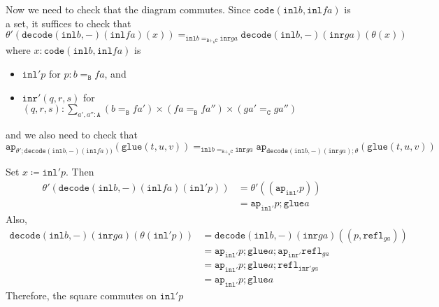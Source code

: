 \documentclass[12pt]{amsart}
\newcommand{\type}[1]{\mathtt{#1}}
\newcommand{\tin}{\colon}
\newcommand{\A}{\type{A}}
\newcommand{\B}{\type{B}}
\newcommand{\C}{\type{C}}
\newcommand{\BAC}{\B +_{\A} \C}
\newcommand{\ap}{\type{ap}}
\newcommand{\inl}{\type{inl}}
\newcommand{\inr}{\type{inr}}
\newcommand{\glue}{\type{glue}}
\newcommand{\refl}{\type{refl}}
\newcommand{\code}{\type{code}}
\newcommand{\decode}{\type{decode}}
\theoremstyle{remark}
\theoremstyle{definition}
\begin{document}
Now we need to check that the diagram commutes.  Since \( \code ( \inl
b , \inl fa ) \) is a set, it suffices to check that
\[
  \theta' ( \decode (\inl b,-) ( \inl fa ) ( x ) )
  =_{ \inl b =_{\BAC} \inr ga }
  \decode ( \inl b,-)(\inr ga) ( \theta ( x ) )
\]
where \( x \tin \code ( \inl b, \inl fa ) \) is
\begin{itemize}
\item
  \( \inl' p \) for \( p \tin b=_\B fa \), and
\item
  \( \inr' ( q,r,s ) \) for
  \( ( q,r,s ) \tin \sum\limits_{a',a'' \tin \A} (b=_\B fa') \times (
  fa =_\B fa'' )\times ( ga'=_\C ga'' ) \)
\end{itemize}
and we also need to check that
\[
  \ap_{\theta' ; \decode (\inl b,-) ( \inl fa ) )} ( \glue ( t,u,v ) ) 
  =_{ \inl b =_{\BAC} \inr ga }
  \ap_{ \decode ( \inl b,-)(\inr ga) ; \theta } ( \glue ( t,u,v ) ) 
\]

Set \( x \coloneqq \inl' p \).  Then
\begin{align*}
  \theta' ( \decode (\inl b,-) ( \inl fa ) ( \inl' p ) )
  & = \theta' ( ( \ap_{\inl'} p ) ) \\
  & = \ap_{\inl'} p ; \glue a
\end{align*}
Also,
\begin{align*}
  \decode ( \inl b , - ) ( \inr ga ) ( \theta ( \inl' p ) )
  & = \decode ( \inl b , - ) ( \inr ga ) ( ( p,\refl_{ga} ) ) \\
  & = \ap_{\inl'} p ; \glue a ; \ap_{\inr'} \refl_{ga} \\
  & = \ap_{\inl'} p ; \glue a ; \refl_{\inr' ga} \\
  & = \ap_{\inl'} p ; \glue a
\end{align*}
Therefore, the square commutes on \( \inl' p \)
\end{document}
